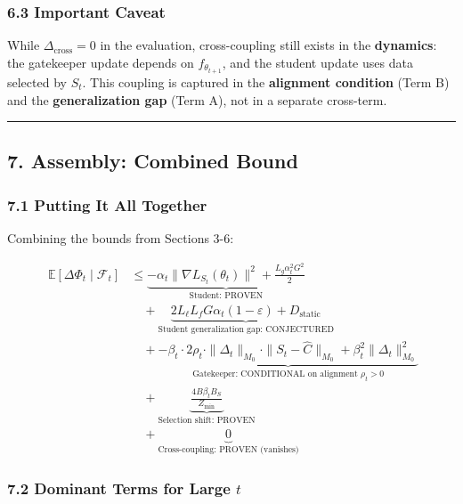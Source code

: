 \documentclass[
  12pt,
]{ctexart}
\begin{document}
\subsubsection{6.3 Important Caveat}\label{important-caveat}

While \(\Delta_{\text{cross}} = 0\) in the evaluation, cross-coupling
still exists in the \textbf{dynamics}: the gatekeeper update depends on
\(f_{\theta_{t+1}}\), and the student update uses data selected by
\(S_t\). This coupling is captured in the \textbf{alignment condition}
(Term B) and the \textbf{generalization gap} (Term A), not in a separate
cross-term.

\begin{center}\rule{0.5\linewidth}{0.5pt}\end{center}

\subsection{7. Assembly: Combined Bound}\label{assembly-combined-bound}

\subsubsection{7.1 Putting It All
Together}\label{putting-it-all-together}

Combining the bounds from Sections 3-6:

\[\boxed{\;\begin{aligned}
\mathbb{E}[\Delta\Phi_t \mid \mathcal{F}_t] &\leq \underbrace{-\alpha_t \|\nabla L_{S_t}(\theta_t)\|^2 + \frac{L_g \alpha_t^2 G^2}{2}}_{\text{Student: PROVEN}} \\
&\quad + \underbrace{2 L_\ell L_f G \alpha_t (1-\varepsilon) + D_{\text{static}}}_{\text{Student generalization gap: CONJECTURED}} \\
&\quad + \underbrace{-\beta_t \cdot 2\rho_t \cdot \|\Delta_t\|_{M_0} \cdot \|S_t - \hat{C}\|_{M_0} + \beta_t^2 \|\Delta_t\|_{M_0}^2}_{\text{Gatekeeper: CONDITIONAL on alignment } \rho_t > 0} \\
&\quad + \underbrace{\frac{4B \beta_t B_S}{Z_{\min}}}_{\text{Selection shift: PROVEN}} \\
&\quad + \underbrace{0}_{\text{Cross-coupling: PROVEN (vanishes)}}
\end{aligned}}\]

\subsubsection{\texorpdfstring{7.2 Dominant Terms for Large
\(t\)}{7.2 Dominant Terms for Large t}}\label{dominant-terms-for-large-t}
\end{document}
